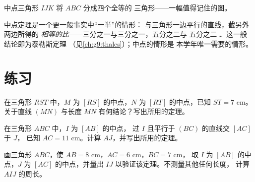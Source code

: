 \begin{omfigure}

{\small 中点三角形 $IJK$ 将 $ABC$ 分成四个全等的
三角形——一幅值得记住的图。}
\end{omfigure}

\begin{remark}[迈向泰勒斯]
中点定理是一个更一般事实中“一半”的情形：
与三角形一边平行的直线，截另外两边所得的
\emph{相等的比}——三分之一与三分之一，五分之二与
五分之二\,\dots\ 这一般结论即为泰勒斯定理
（见\cref{ch:g9:thales}）；中点的情形是
本学年唯一需要的情形。
\end{remark}

\section{练习}

\begin{exercise}[$\star$]\label{exo:g8:midpoints:1}
在三角形 $RST$ 中，$M$ 为 $[RS]$ 的中点，$N$ 为
$[RT]$ 的中点，已知 $ST = 7$ cm。关于直线
$(MN)$ 与长度 $MN$ 有何结论？写出所用的定理。
\end{exercise}

\begin{exercise}[$\star$]\label{exo:g8:midpoints:2}
在三角形 $ABC$ 中，$I$ 为 $[AB]$ 的中点，
过 $I$ 且平行于 $(BC)$ 的直线交 $[AC]$ 于 $J$，
已知 $AC = 11$ cm。计算 $AJ$，并写出所用的定理。
\end{exercise}

\begin{exercise}[$\star$]\label{exo:g8:midpoints:3}
画三角形 $ABC$，使 $AB = 8$ cm，$AC = 6$ cm，$BC = 7$ cm，
取 $I$ 为 $[AB]$ 的中点，$J$ 为 $[AC]$ 的中点，并量出 $IJ$
以验证该定理。不测量其他任何长度，
计算 $AIJ$ 的周长。
\end{exercise}

